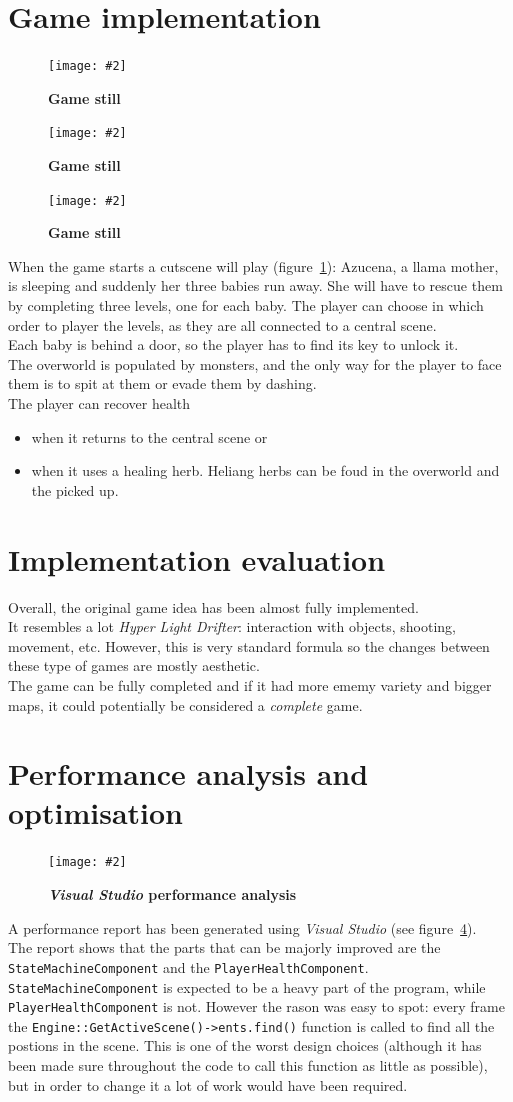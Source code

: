 \documentclass[10pt, a4paper]{article}
\newcommand{\figuremacro}[5]{
    \begin{figure}[#1]
        \centering
        \texttt{[image: \#2]}
        \caption[#3]{\textbf{#3}#4}
        \label{fig:#2}
    \end{figure}
}
\begin{document}
    \section{Game implementation}
    \figuremacro{h}{capture01}{Game still}{}{1.0}
    \figuremacro{h}{capture02}{Game still}{}{1.0}
    \figuremacro{h}{capture03}{Game still}{}{1.0}
    When the game starts a cutscene will play (figure~\ref{fig:capture01}): Azucena, a llama mother, is sleeping and suddenly her three babies run away. She will have to rescue them by completing three levels, one for each baby. The player can choose in which order to player the levels, as they are all connected to a central scene.\\
    Each baby is behind a door, so the player has to find its key to unlock it.\\
    The overworld is populated by monsters, and the only way for the player to face them is to spit at them or evade them by dashing.\\
    The player can recover health
    \begin{itemize}
    	\item when it returns to the central scene or
    	\item when it uses a healing herb. Heliang herbs can be foud in the overworld and the picked up.
    \end{itemize}
    
    \section{Implementation evaluation}
    Overall, the original game idea has been almost fully implemented.\\
    It resembles a lot \textit{Hyper Light Drifter}: interaction with objects, shooting, movement, etc. However, this is very standard formula so the changes between these type of games are mostly aesthetic.\\
    The game can be fully completed and if it had more ememy variety and bigger maps, it could potentially be considered a \textit{complete} game.
    
    \section{Performance analysis and optimisation}
    \figuremacro{h}{performance}{\textit{Visual Studio} performance analysis}{}{1.0}
    A performance report has been generated using \textit{Visual Studio} (see figure~\ref{fig:performance}).\\
    The report shows that the parts that can be majorly improved are the \texttt{StateMachineComponent} and the \texttt{PlayerHealthComponent}.\\
    \texttt{StateMachineComponent} is expected to be a heavy part of the program, while \texttt{PlayerHealthComponent} is not. However the rason was easy to spot: every frame the \texttt{Engine::GetActiveScene()->ents.find()} function is called to find all the postions in the scene. This is one of the worst design choices (although it has been made sure throughout the code to call this function as little as possible), but in order to change it a lot of work would have been required.
    
\end{document}
